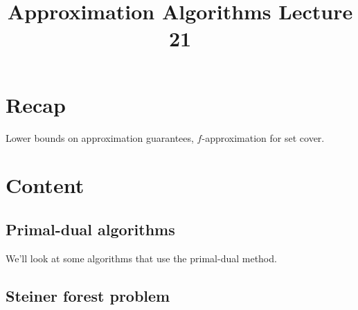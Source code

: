 \documentclass[a4paper]{article}
\title{\textbf{Approximation Algorithms Lecture 21}}
\date{}
\begin{document}
\maketitle
\tableofcontents

\section{Recap}

Lower bounds on approximation guarantees, $f$-approximation for set cover.

\section{Content}

\subsection{Primal-dual algorithms}

We'll look at some algorithms that use the primal-dual method.

\subsection{Steiner forest problem}
\end{document}
